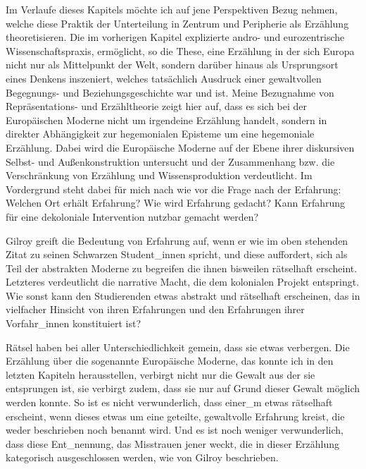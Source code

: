 Im Verlaufe dieses Kapitels möchte ich auf jene Perspektiven Bezug nehmen,
welche diese Praktik der Unterteilung in Zentrum und Peripherie als Erzählung
theoretisieren. Die im vorherigen Kapitel explizierte andro- und eurozentrische
Wissenschaftspraxis, ermöglicht, so die These, eine Erzählung in der sich
Europa nicht nur als Mittelpunkt der Welt, sondern darüber hinaus als
Ursprungsort eines Denkens inszeniert, welches tatsächlich Ausdruck einer
gewaltvollen Begegnungs- und Beziehungsgeschichte war und ist. Meine
Bezugnahme von Repräsentations- und Erzähltheorie zeigt hier auf, dass es sich
bei der Europäischen Moderne nicht um irgendeine Erzählung handelt, sondern in
direkter Abhängigkeit zur hegemonialen Episteme um eine hegemoniale Erzählung.
Dabei wird die Europäische Moderne auf der Ebene ihrer diskursiven Selbst- und
Außenkonstruktion untersucht und der Zusammenhang bzw. die Verschränkung von
Erzählung und Wissensproduktion verdeutlicht. Im Vordergrund steht dabei für
mich nach wie vor die Frage nach der Erfahrung: Welchen Ort erhält Erfahrung?
Wie wird Erfahrung gedacht? Kann Erfahrung für eine dekoloniale Intervention
nutzbar gemacht werden?

Gilroy greift die Bedeutung von Erfahrung auf, wenn er wie im oben stehenden
Zitat zu seinen Schwarzen Student\_innen spricht, und diese auffordert, sich als
Teil der \glqq abstrakten Moderne \grqq\footnotemark {} zu begreifen die ihnen bisweilen \glqq rätselhaft
\grqq\footnotemark {}
erscheint. Letzteres verdeutlicht die narrative Macht, die dem kolonialen
Projekt entspringt. Wie sonst kann den Studierenden etwas abstrakt und
rätselhaft erscheinen, das in vielfacher Hinsicht von ihren Erfahrungen und den
Erfahrungen ihrer Vorfahr\_innen konstituiert ist? 

Rätsel haben bei aller Unterschiedlichkeit gemein, dass sie etwas verbergen.
Die Erzählung über die sogenannte Europäische Moderne, das konnte ich in den
letzten Kapiteln herausstellen, verbirgt nicht nur die Gewalt aus der sie
entsprungen ist, sie verbirgt zudem, dass sie nur auf Grund dieser Gewalt
möglich werden konnte. So ist es nicht verwunderlich, dass einer\_m etwas
rätselhaft erscheint, wenn dieses etwas um eine geteilte, gewaltvolle Erfahrung
kreist, die weder beschrieben noch benannt wird. Und es ist noch weniger
verwunderlich, dass diese Ent\_nennung, das Misstrauen jener weckt, die in
dieser Erzählung kategorisch ausgeschlossen werden, wie von Gilroy beschrieben.

